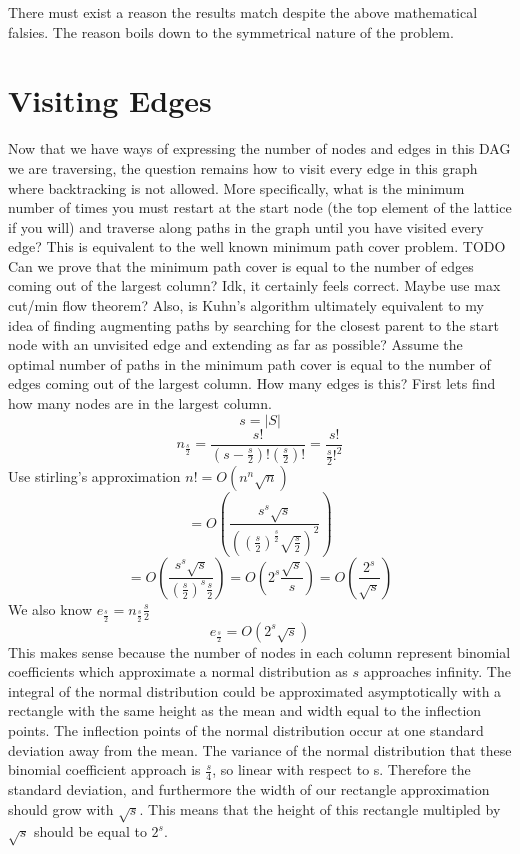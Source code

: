 \documentclass{article}
\begin{document}
There must exist a reason the results match despite the above mathematical falsies. The reason boils down to the symmetrical nature of the problem.


\section{Visiting Edges}
Now that we have ways of expressing the number of nodes and edges in this DAG
we are traversing, the question remains how to visit every edge in this graph
where backtracking is not allowed. More specifically, what is the minimum
number of times you must restart at the start node (the top element of the
lattice if you will) and traverse along paths in the graph until you have
visited every edge? This is equivalent to the well known minimum path cover
problem.  TODO Can we prove that the minimum path cover is equal to the number
of edges coming out of the largest column? Idk, it certainly feels correct.
Maybe use max cut/min flow theorem? Also, is Kuhn's algorithm ultimately
equivalent to my idea of finding augmenting paths by searching for the closest
parent to the start node with an unvisited edge and extending as far as
possible?  Assume the optimal number of paths in the minimum path cover is
equal to the number of edges coming out of the largest column. How many edges
is this? First lets find how many nodes are in the largest column.
$$s = |S|$$
$$n_{\frac{s}{2}} = \frac{s!}{(s - \frac{s}{2})!(\frac{s}{2})!} = \frac{s!}{\frac{s}{2}!^2}$$
Use stirling's approximation $n! = O(n^n\sqrt{n})$
$$ = O(\frac{s^s\sqrt{s}}{((\frac{s}{2})^\frac{s}{2}\sqrt{\frac{s}{2}})^2})$$
$$ = O(\frac{s^s\sqrt{s}}{(\frac{s}{2})^s\frac{s}{2}}) = O(2^s\frac{\sqrt{s}}{s}) = O(\frac{2^s}{\sqrt{s}})$$
We also know $e_{\frac{s}{2}} = n_{\frac{s}{2}}\frac{s}{2}$
$$e_{\frac{s}{2}} = O(2^s\sqrt{s})$$
This makes sense because the number of nodes in each column represent binomial coefficients which approximate a normal distribution as $s$ approaches infinity. The integral of the normal distribution could be approximated asymptotically with a rectangle with the same height as the mean and width equal to the inflection points. The inflection points of the normal distribution occur at one standard deviation away from the mean. The variance of the normal distribution that these binomial coefficient approach is $\frac{s}{4}$, so linear with respect to s. Therefore the standard deviation, and furthermore the width of our rectangle approximation should grow with $\sqrt{s}$. This means that the height of this rectangle multipled by $\sqrt{s}$ should be equal to $2^s$.
\end{document}
